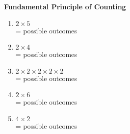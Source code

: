 \begin{center}
\textbf{Fundamental Principle of Counting}\\
\end{center}

\vspace*{1ex}

\begin{enumerate}[label = \arabic*. ]

\item%
$ 2 \times 5 $ \redcheck \\
= \redcheck 
possible outcomes \redcheck 
 
\item %
$ 2 \times 4 $ \redcheck \\
= \redcheck 
possible outcomes \redcheck 
 
\item%
$ 2 \times 2 \times 2 \times 2 \times 2 $ \redcheck \\
= \redcheck 
possible outcomes \redcheck 
 
\item %
$ 2 \times 6 $ \redcheck \\
= \redcheck 
possible outcomes \redcheck 
 
\item %
$ 4 \times 2 $ \redcheck \\
= \redcheck 
possible outcomes \redcheck 
 
\end{enumerate}   
 
